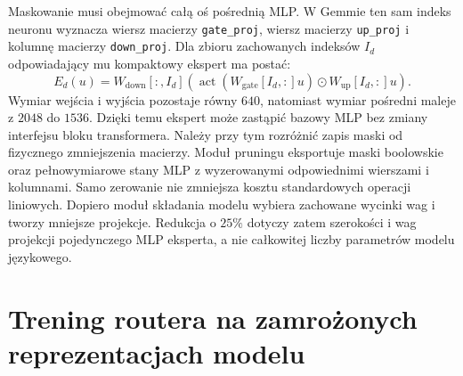 Maskowanie musi obejmować całą oś pośrednią MLP. W Gemmie ten sam indeks neuronu wyznacza wiersz macierzy \texttt{gate\_proj}, wiersz macierzy \texttt{up\_proj} i kolumnę macierzy \texttt{down\_proj}. Dla zbioru zachowanych indeksów $I_d$ odpowiadający mu kompaktowy ekspert ma postać:
\[
E_d(u)=W_{\mathrm{down}}[:,I_d]
\left(\operatorname{act}\left(W_{\mathrm{gate}}[I_d,:]u\right)
\odot W_{\mathrm{up}}[I_d,:]u\right).
\]
Wymiar wejścia i wyjścia pozostaje równy $640$, natomiast wymiar pośredni maleje z $2048$ do $1536$. Dzięki temu ekspert może zastąpić bazowy MLP bez zmiany interfejsu bloku transformera. \newline
Należy przy tym rozróżnić zapis maski od fizycznego zmniejszenia macierzy. Moduł pruningu eksportuje maski boolowskie oraz pełnowymiarowe stany MLP z wyzerowanymi odpowiednimi wierszami i kolumnami. Samo zerowanie nie zmniejsza kosztu standardowych operacji liniowych. Dopiero moduł składania modelu wybiera zachowane wycinki wag i tworzy mniejsze projekcje. Redukcja o $25\%$ dotyczy zatem szerokości i wag projekcji pojedynczego MLP eksperta, a nie całkowitej liczby parametrów modelu językowego.

\section{Trening routera na zamrożonych reprezentacjach modelu}
\label{sec:trening_routera}

